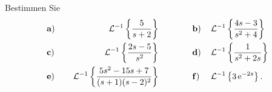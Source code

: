 {
Bestimmen Sie
\begin{align*}
&\text{\textbf a)}&&\, &\mathcal{L}^{-1}\left\{ \frac 5{s+2}\right\}&
\qquad\qquad\text{\textbf b)}& \, &\mathcal{L}^{-1}\left\{\frac {4s-3}{s^2+4}\right\}\\
&\text{\textbf c)}&&\, &\mathcal{L}^{-1}\left\{ \frac {2s-5}{s^2}\right\}&
\qquad\qquad\text{\textbf d)}& \, &\mathcal{L}^{-1}\left\{ \frac 1{s^2+2s}\right\}\\
&\text{\textbf e)}&&\, &\mathcal{L}^{-1}\left\{\frac {5s^2-15s+7}{(s+1)(s-2)^2}\right\}&
\qquad\qquad\text{\textbf f)}&\, &\mathcal{L}^{-1}\left\{3\operatorname{e}^{-2s}\right\}.
\end{align*}
}

